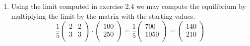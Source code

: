 \documentclass[a4paper]{article}
\begin{document}
\begin{enumerate}
\begin{align*}
\begin{array}{cc}
    2 & 2 \\
    3 & 3 \\
    \end{array}
    \right)
  \end{align*}
  \item Using the limit computed in exercise 2.4 we may compute the equilibrium by multiplying the limit by the matrix with the starting values.
  \[
  \frac{1}{5}
  \left(
  \begin{array}{cc}
  2 & 2 \\
  3 & 3 \\
  \end{array}
  \right)
  \cdot
  \left(
  \begin{array}{c}
  100 \\
  250 \\
  \end{array}
  \right)
  =
  \frac{1}{5}
  \left(
  \begin{array}{c}
  700 \\
  1050 \\
  \end{array}
  \right)
  =
  \left(
  \begin{array}{c}
  140 \\
  210 \\
  \end{array}
  \right)
  \]
\end{enumerate}
\end{document}
